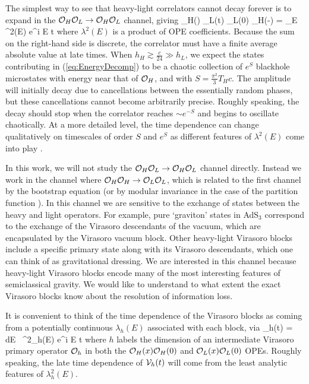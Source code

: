 The simplest way to see that heavy-light correlators cannot decay forever is to expand in the ${\cal O}_H {\cal O}_L \to {\cal O}_H {\cal O}_L$ channel, giving
\be \label{eq:EnergyDecomp}
\< \CO_H(\infty) \CO_L(t) \CO_L(0) \CO_H(-\infty) \> = \sum_E   \lambda^2(E) e^{i E t}
\ee
where $\lambda^2(E)$ is a product of OPE coefficients.  Because the sum on the right-hand side is discrete, the correlator must have a finite average absolute value at late times.
When $h_{H} \gtrsim \frac{c}{24} \gg h_{L}$, we expect the states contributing in (\ref{eq:EnergyDecomp}) to be a chaotic collection of $e^{S}$ blackhole microstates with energy near that of ${\cal O}_{H}$, and with $S = \frac{\pi^2}{3} T_H c$. The amplitude will initially decay  due to cancellations between the essentially random phases, but  these cancellations cannot become arbitrarily precise.  Roughly speaking, the decay should stop when the correlator reaches $\sim e^{-S}$ and begins to oscillate chaotically.  At a more detailed level, the time dependence can change qualitatively on timescales of order $S$ and $e^S$ as different features of $\lambda^2(E)$ come into play \cite{Barbon:2014rma, Cotler:2016fpe, Dyer:2016pou, delCampo:2017bzr}.

In this work, we will not study the ${\cal O}_H {\cal O}_L \to {\cal O}_H {\cal O}_L$ channel directly.   Instead we work in the channel where ${\cal O}_{H} {\cal O}_{H} \to {\cal O}_{L} {\cal O}_{L}$, which is related to the first channel by the bootstrap equation (or by modular invariance in the case of the partition function \cite{Dyer:2016pou}).  In this channel we are sensitive to the exchange of states between the heavy and light operators.  For example, pure `graviton' states in AdS$_3$ correspond to the exchange of the Virasoro descendants of the vacuum, which are encapsulated by the Virasoro  vacuum block.  Other heavy-light Virasoro blocks include a specific primary state along with its Virasoro descendants, which one can think of as gravitational dressing.  We are interested in this channel because heavy-light Virasoro blocks encode many of the most interesting features of semiclassical gravity.  We would like to understand to what extent the exact Virasoro blocks know about the resolution of information loss.

It is convenient to think of the time dependence of the Virasoro blocks as coming from a potentially continuous $\lambda_h(E)$ associated with each block, via
\be \label{eq:VasEIntegral}
\CV_h(t) = \int dE \, \lambda^2_h(E) e^{i E t}
\ee
where $h$ labels the dimension of an intermediate Virasoro primary operator ${\cal O}_h$  in both the ${\cal O}_{H}(x) {\cal O}_{H}(0)$ and  ${\cal O}_{L}(x) {\cal O}_{L}(0)$ OPEs.  Roughly speaking, the late time dependence of ${\cal V}_h(t)$ will come from the least analytic features of $\lambda_h^2(E)$. 

